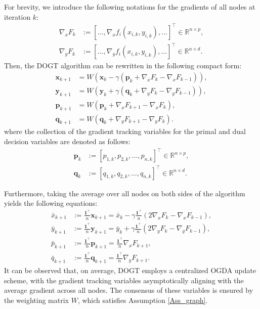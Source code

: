 \documentclass[letterpaper, 10 pt, conference]{ieeeconf}
\begin{document}
For brevity, we introduce the following notations for the gradients of all nodes at iteration $k$:
\begin{equation*}
\begin{aligned}
\nabla _xF_k&:=\left[ \dots ,\nabla _xf_i\left( x_{i,k},y_{i,k} \right) ,\dots \right] ^{\top} \in \mathbb{R} ^{n\times p},
\\
\nabla _yF_k&:=\left[ \dots ,\nabla _yf_i\left( x_{i,k},y_{i,k} \right) ,\dots \right] ^{\top} \in \mathbb{R} ^{n\times d}.
\end{aligned}
\end{equation*}
Then, the DOGT algorithm can be rewritten in the following compact form:
\begin{equation}\label{Eq_DOGT}
\begin{aligned}
\mathbf{x}_{k+1}&=W\left( \mathbf{x}_k-\gamma \left( \mathbf{p}_k+\nabla _xF_k-\nabla _xF_{k-1} \right) \right),
\\
\mathbf{y}_{k+1}&=W\left( \mathbf{y}_k+\gamma \left( \mathbf{q}_k+\nabla _yF_k-\nabla _yF_{k-1} \right) \right),
\\
\mathbf{p}_{k+1}&=W\left( \mathbf{p}_k+\nabla _xF_{k+1}-\nabla _xF_k \right) ,
\\
\mathbf{q}_{k+1}&=W\left( \mathbf{q}_k+\nabla _yF_{k+1}-\nabla _yF_k \right) .
\end{aligned}
\end{equation}
where the collection of the gradient tracking variables for the primal and dual decision variables are denoted as follows:
\begin{equation*}
\begin{aligned}
\mathbf{p}_k&:=\left[ p_{1,k},p_{2,k},\dots ,p_{n,k} \right] ^{\top}\in \mathbb{R} ^{n\times p},
\\
\mathbf{q}_k&:=\left[ q_{1,k},q_{2,k},\dots ,q_{n,k} \right] ^{\top}\in \mathbb{R} ^{n\times d}.
\end{aligned}
\end{equation*}


Furthermore, taking the average over all nodes on both sides of the algorithm yields the following equations:
\begin{equation}
\begin{aligned}
\bar{x}_{k+1}&:=\frac{\mathbf{1}^{\top}}{n}\mathbf{x}_{k+1}=\bar{x}_k-\gamma \frac{\mathbf{1}^{\top}}{n}\left( 2\nabla _xF_k-\nabla _xF_{k-1} \right) ,
\\
\bar{y}_{k+1}&:=\frac{\mathbf{1}^{\top}}{n}\mathbf{y}_{k+1}=\bar{y}_k+\gamma \frac{\mathbf{1}^{\top}}{n}\left( 2\nabla _yF_k-\nabla _yF_{k-1} \right),
\\
\bar{p}_{k+1}&:=\frac{\mathbf{1}^{\top}}{n}\mathbf{p}_{k+1}=\frac{\mathbf{1}^{\top}}{n}\nabla _xF_{k+1},
\\
\bar{q}_{k+1}&:=\frac{\mathbf{1}^{\top}}{n}\mathbf{q}_{k+1}=\frac{\mathbf{1}^{\top}}{n}\nabla _yF_{k+1}.
\end{aligned}
\end{equation}
It can be observed that, on average, DOGT employs a centralized OGDA update scheme, with the gradient tracking variables asymptotically aligning with the average gradient across all nodes. The consensus of these variables is ensured by the weighting matrix $W$, which satisfies Assumption \ref{Ass_graph}.
\end{document}
